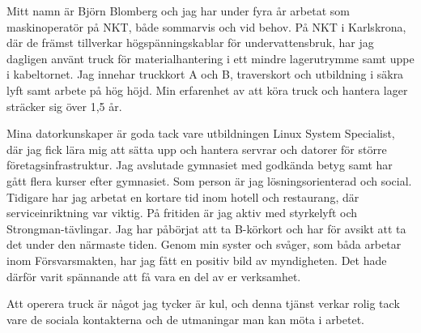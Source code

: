 Mitt namn är Björn Blomberg och jag har under fyra år arbetat som maskinoperatör på NKT, både sommarvis och vid behov. På NKT i Karlskrona, där de främst tillverkar högspänningskablar för undervattensbruk, har jag dagligen använt truck för materialhantering i ett mindre lagerutrymme samt uppe i kabeltornet. Jag innehar truckkort A och B, traverskort och utbildning i säkra lyft samt arbete på hög höjd. Min erfarenhet av att köra truck och hantera lager sträcker sig över 1,5 år.

\vspace{6pt}
Mina datorkunskaper är goda tack vare utbildningen Linux System Specialist, där jag fick lära mig att sätta upp och hantera servrar och datorer för större företagsinfrastruktur. Jag avslutade gymnasiet med godkända betyg samt har gått flera kurser efter gymnasiet. Som person är jag lösningsorienterad och social. Tidigare har jag arbetat en kortare tid inom hotell och restaurang, där serviceinriktning var viktig. På fritiden är jag aktiv med styrkelyft och Strongman-tävlingar. Jag har påbörjat att ta B-körkort och har för avsikt att ta det under den närmaste tiden. Genom min syster och svåger, som båda arbetar inom Försvarsmakten, har jag fått en positiv bild av myndigheten. Det hade därför varit spännande att få vara en del av er verksamhet.

\vspace{6pt}
Att operera truck är något jag tycker är kul, och denna tjänst verkar rolig tack vare de sociala kontakterna och de utmaningar man kan möta i arbetet.